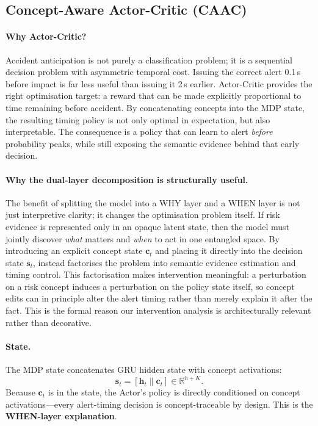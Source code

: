 \subsection{Concept-Aware Actor-Critic (CAAC)}

\paragraph{Why Actor-Critic?}
Accident anticipation is not purely a classification problem;
it is a sequential decision problem with asymmetric temporal cost.
Issuing the correct alert 0.1\,s before impact is far less useful
than issuing it 2\,s earlier.
Actor-Critic provides the right optimisation target: a reward that
can be made explicitly proportional to time remaining before accident.
By concatenating concepts into the MDP state, the resulting timing
policy is not only optimal in expectation, but also interpretable.
The consequence is a policy that can learn to alert \emph{before}
probability peaks, while still exposing the semantic evidence behind
that early decision.

\paragraph{Why the dual-layer decomposition is structurally useful.}
The benefit of splitting the model into a WHY layer and a WHEN layer is not
just interpretive clarity; it changes the optimisation problem itself.
If risk evidence is represented only in an opaque latent state, then the model
must jointly discover \emph{what} matters and \emph{when} to act in one
entangled space. By introducing an explicit concept state $\mathbf{c}_t$ and
placing it directly into the decision state $\mathbf{s}_t$, \method{} instead
factorises the problem into semantic evidence estimation and timing control.
This factorisation makes intervention meaningful: a perturbation on a risk
concept induces a perturbation on the policy state itself, so concept edits can
in principle alter the alert timing rather than merely explain it after the
fact. This is the formal reason our intervention analysis is architecturally
relevant rather than decorative.

\paragraph{State.}
The MDP state concatenates GRU hidden state with concept activations:
\begin{equation}
  \mathbf{s}_t = [\mathbf{h}_t \| \mathbf{c}_t] \in \mathbb{R}^{h+K}.
  \label{eq:state}
\end{equation}
Because $\mathbf{c}_t$ is in the state, the Actor's policy is directly
conditioned on concept activations---every alert-timing decision is
concept-traceable by design. This is the \textbf{WHEN-layer explanation}.

